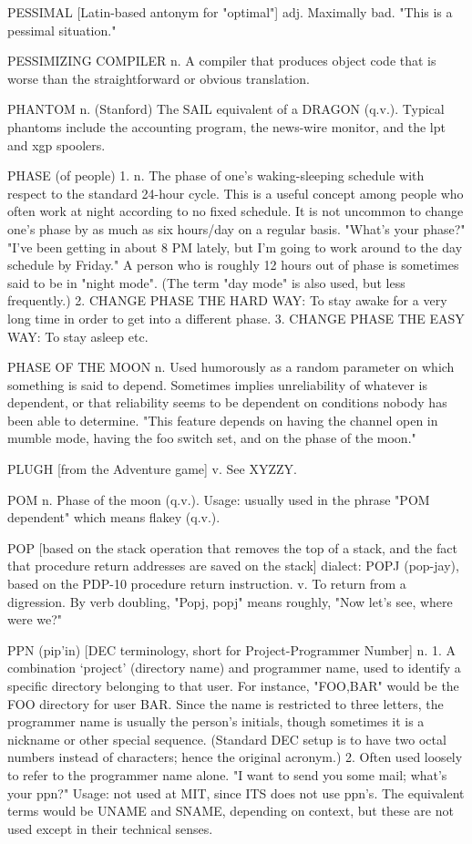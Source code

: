 PESSIMAL [Latin-based antonym for "optimal"] adj. Maximally bad.
   "This is a pessimal situation."

PESSIMIZING COMPILER n. A compiler that produces object code that is
   worse than the straightforward or obvious translation.

PHANTOM n. (Stanford) The SAIL equivalent of a DRAGON (q.v.).  Typical
   phantoms include the accounting program, the news-wire monitor, and
   the lpt and xgp spoolers.

PHASE (of people) 1. n. The phase of one's waking-sleeping schedule
   with respect to the standard 24-hour cycle.	This is a useful
   concept among people who often work at night according to no fixed
   schedule.  It is not uncommon to change one's phase by as much as
   six hours/day on a regular basis.  "What's your phase?"  "I've been
   getting in about 8 PM lately, but I'm going to work around to the
   day schedule by Friday."  A person who is roughly 12 hours out of
   phase is sometimes said to be in "night mode".  (The term "day
   mode" is also used, but less frequently.)  2. CHANGE PHASE THE HARD
   WAY: To stay awake for a very long time in order to get into a
   different phase.  3. CHANGE PHASE THE EASY WAY: To stay asleep etc.

PHASE OF THE MOON n. Used humorously as a random parameter on which
   something is said to depend.	 Sometimes implies unreliability of
   whatever is dependent, or that reliability seems to be dependent on
   conditions nobody has been able to determine.  "This feature
   depends on having the channel open in mumble mode, having the foo
   switch set, and on the phase of the moon."

PLUGH [from the Adventure game] v. See XYZZY.

POM n. Phase of the moon (q.v.).  Usage: usually used in the phrase
   "POM dependent" which means flakey (q.v.).

POP [based on the stack operation that removes the top of a stack, and
   the fact that procedure return addresses are saved on the stack]
   dialect: POPJ (pop-jay), based on the PDP-10 procedure return
   instruction.	 v. To return from a digression.  By verb doubling,
   "Popj, popj" means roughly, "Now let's see, where were we?"

PPN (pip'in) [DEC terminology, short for Project-Programmer Number] n.
   1. A combination `project' (directory name) and programmer name,
   used to identify a specific directory belonging to that user.  For
   instance, "FOO,BAR" would be the FOO directory for user BAR.	 Since
   the name is restricted to three letters, the programmer name is
   usually the person's initials, though sometimes it is a nickname or
   other special sequence.  (Standard DEC setup is to have two octal
   numbers instead of characters; hence the original acronym.)	2.
   Often used loosely to refer to the programmer name alone.  "I want
   to send you some mail; what's your ppn?"  Usage: not used at MIT,
   since ITS does not use ppn's.  The equivalent terms would be UNAME
   and SNAME, depending on context, but these are not used except in
   their technical senses.

